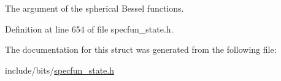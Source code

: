 The argument of the spherical Bessel functions. 



Definition at line 654 of file specfun\+\_\+state.\+h.



The documentation for this struct was generated from the following file\+:\begin{DoxyCompactItemize}
\item 
include/bits/\hyperlink{specfun__state_8h}{specfun\+\_\+state.\+h}\end{DoxyCompactItemize}
